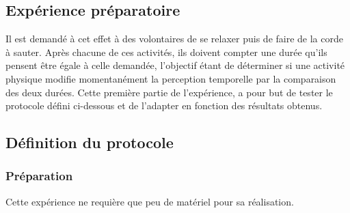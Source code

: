 \documentclass[12pt,fleqn,oneside,openany]{book} %
\begin{document}
\subsection{Expérience préparatoire} \label{ssec:but2.1}
Il est demandé à cet effet à des volontaires de se relaxer puis de faire de la corde à sauter. Après chacune de ces activités, ils doivent compter une durée qu'ils pensent être égale à celle demandée, l'objectif étant de déterminer si une activité physique modifie momentanément la perception temporelle par la comparaison des deux durées. Cette première partie de l'expérience, a pour but de tester le protocole défini ci-dessous et de l'adapter en fonction des résultats obtenus.

\subsection{Définition du protocole} \label{ssec:defProto2.1}

\subsubsection{Préparation} \label{sssec:preparation2.1}
Cette expérience ne requière que peu de matériel pour sa réalisation.
\end{document}
